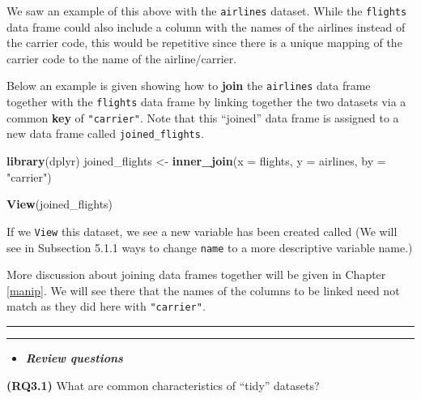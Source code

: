 \documentclass[]{tufte-book}
\newenvironment{Shaded}{\begin{snugshade}}{\end{snugshade}}
\newcommand{\KeywordTok}[1]{\textcolor[rgb]{0.13,0.29,0.53}{\textbf{{#1}}}}
\newcommand{\DataTypeTok}[1]{\textcolor[rgb]{0.13,0.29,0.53}{{#1}}}
\newcommand{\StringTok}[1]{\textcolor[rgb]{0.31,0.60,0.02}{{#1}}}
\newcommand{\NormalTok}[1]{{#1}}
\let\oldrule=\rule
\renewcommand{\rule}[1]{\oldrule{\linewidth}}
\newenvironment{rmdblock}[1]
  {\begin{shaded*}
  \begin{itemize}
  \renewcommand{\labelitemi}{
    \raisebox{-.7\height}[0pt][0pt]{
    }
  }
  \item
  }
  {
  \end{itemize}
  \end{shaded*}
  }
\newenvironment{review}
  {\begin{rmdblock}{warning}}
  {\end{rmdblock}}
\begin{document}
We saw an example of this above with the \texttt{airlines} dataset.
While the \texttt{flights} data frame could also include a column with
the names of the airlines instead of the carrier code, this would be
repetitive since there is a unique mapping of the carrier code to the
name of the airline/carrier.

Below an example is given showing how to \textbf{join} the
\texttt{airlines} data frame together with the \texttt{flights} data
frame by linking together the two datasets via a common \textbf{key} of
\texttt{"carrier"}. Note that this ``joined'' data frame is assigned to
a new data frame called \texttt{joined\_flights}.

\begin{Shaded}
\begin{Highlighting}[]
\KeywordTok{library}\NormalTok{(dplyr)}
\NormalTok{joined_flights <-}\StringTok{ }\KeywordTok{inner_join}\NormalTok{(}\DataTypeTok{x =} \NormalTok{flights, }\DataTypeTok{y =} \NormalTok{airlines, }\DataTypeTok{by =} \StringTok{"carrier"}\NormalTok{)}
\end{Highlighting}
\end{Shaded}

\begin{Shaded}
\begin{Highlighting}[]
\KeywordTok{View}\NormalTok{(joined_flights)}
\end{Highlighting}
\end{Shaded}

If we \texttt{View} this dataset, we see a new variable has been created
called (We will see in Subsection 5.1.1 ways to change \texttt{name} to
a more descriptive variable name.)

More discussion about joining data frames together will be given in
Chapter \ref{manip}. We will see there that the names of the columns to
be linked need not match as they did here with \texttt{"carrier"}.

\begin{center}\rule{0.5\linewidth}{\linethickness}\end{center}

\begin{center}\rule{0.5\linewidth}{\linethickness}\end{center}

\begin{review}
\textbf{\emph{Review questions}}
\end{review}

\textbf{(RQ3.1)} What are common characteristics of ``tidy'' datasets?
\end{document}
